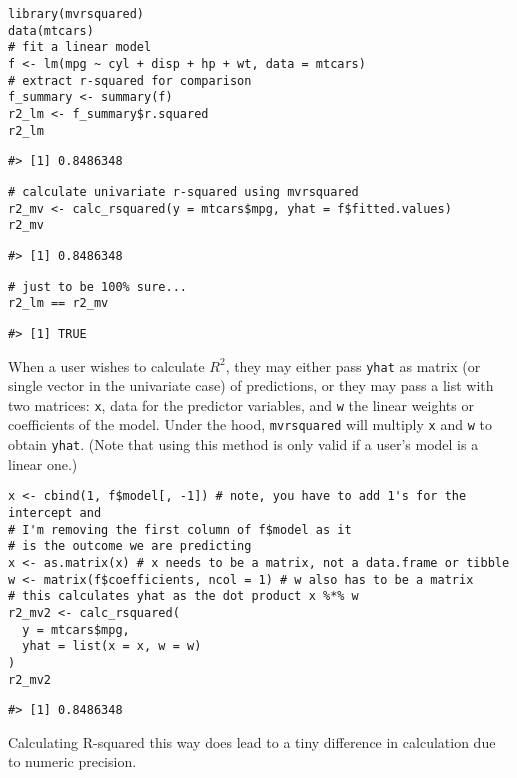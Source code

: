\begin{verbatim}
library(mvrsquared)
data(mtcars)
# fit a linear model
f <- lm(mpg ~ cyl + disp + hp + wt, data = mtcars)
# extract r-squared for comparison
f_summary <- summary(f)
r2_lm <- f_summary$r.squared
r2_lm
\end{verbatim}

\begin{verbatim}
#> [1] 0.8486348
\end{verbatim}

\begin{verbatim}
# calculate univariate r-squared using mvrsquared
r2_mv <- calc_rsquared(y = mtcars$mpg, yhat = f$fitted.values)
r2_mv
\end{verbatim}

\begin{verbatim}
#> [1] 0.8486348
\end{verbatim}

\begin{verbatim}
# just to be 100% sure...
r2_lm == r2_mv
\end{verbatim}

\begin{verbatim}
#> [1] TRUE
\end{verbatim}

When a user wishes to calculate \(R^2\), they may either pass \texttt{yhat} as matrix (or single vector in the univariate case) of predictions, or they may pass a list with two matrices: \texttt{x}, data for the predictor variables, and \texttt{w} the linear weights or coefficients of the model. Under the hood, \texttt{mvrsquared} will multiply \texttt{x} and \texttt{w} to obtain \texttt{yhat}. (Note that using this method is only valid if a user's model is a linear one.)

\begin{verbatim}
x <- cbind(1, f$model[, -1]) # note, you have to add 1's for the intercept and
# I'm removing the first column of f$model as it
# is the outcome we are predicting
x <- as.matrix(x) # x needs to be a matrix, not a data.frame or tibble 
w <- matrix(f$coefficients, ncol = 1) # w also has to be a matrix
# this calculates yhat as the dot product x %*% w
r2_mv2 <- calc_rsquared(
  y = mtcars$mpg, 
  yhat = list(x = x, w = w)
)
r2_mv2
\end{verbatim}

\begin{verbatim}
#> [1] 0.8486348
\end{verbatim}

Calculating R-squared this way does lead to a tiny difference in calculation due to numeric precision.

